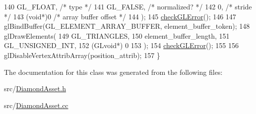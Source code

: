 \begin{DoxyCode}
140     GL\_FLOAT,   \textcolor{comment}{/* type */}
141     GL\_FALSE,   \textcolor{comment}{/* normalized? */}
142     0,        \textcolor{comment}{/* stride */}
143     (\textcolor{keywordtype}{void}*)0    \textcolor{comment}{/* array buffer offset */}
144   );
145   \hyperlink{DiamondAsset_8cc_a75f201b0e53e68726854997957322b8d}{checkGLError}();
146 
147   glBindBuffer(GL\_ELEMENT\_ARRAY\_BUFFER, element\_buffer\_token);
148   glDrawElements(
149     GL\_TRIANGLES,
150     element\_buffer\_length,
151     GL\_UNSIGNED\_INT,
152     (GLvoid*) 0
153   );
154   \hyperlink{DiamondAsset_8cc_a75f201b0e53e68726854997957322b8d}{checkGLError}();
155 
156   glDisableVertexAttribArray(position\_attrib);
157 \}
\end{DoxyCode}


The documentation for this class was generated from the following files\+:\begin{DoxyCompactItemize}
\item 
src/\hyperlink{DiamondAsset_8h}{Diamond\+Asset.\+h}\item 
src/\hyperlink{DiamondAsset_8cc}{Diamond\+Asset.\+cc}\end{DoxyCompactItemize}
